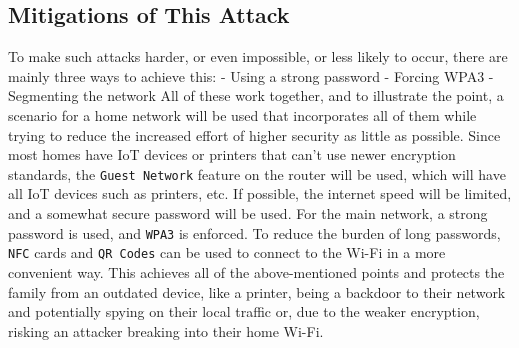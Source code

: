 \documentclass[a4paper]{article}
\begin{document}
\subsection{Mitigations of This Attack}
To make such attacks harder, or even impossible, or less likely to occur, there are mainly three ways to achieve this: \nl
- Using a strong password \nl
- Forcing WPA3 \nl
- Segmenting the network \nl
All of these work together, and to illustrate the point, a scenario for a home network will be used that incorporates all of them while trying to reduce the increased effort of higher security as little as possible. \nl \nl
Since most homes have IoT devices or printers that can't use newer encryption standards, the \texttt{Guest Network} feature on the router will be used, which will have all IoT devices such as printers, etc. If possible, the internet speed will be limited, and a somewhat secure password will be used. \nl
For the main network, a strong password is used, and \texttt{WPA3} is enforced. To reduce the burden of long passwords, \texttt{NFC} cards and \texttt{QR Codes} can be used to connect to the Wi-Fi in a more convenient way. \nl \nl
This achieves all of the above-mentioned points and protects the family from an outdated device, like a printer, being a backdoor to their network and potentially spying on their local traffic or, due to the weaker encryption, risking an attacker breaking into their home Wi-Fi.
\end{document}
